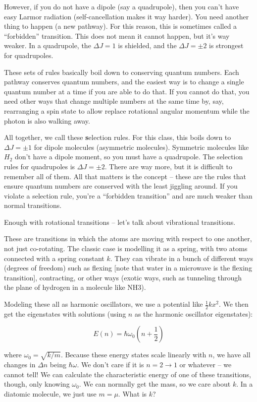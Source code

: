 \documentclass{article}
\newcommand{\be}{\begin{equation}}
\newcommand{\ee}{\end{equation}}
\begin{document}
However, if you do not have a dipole (say a quadrupole), then you can't have easy Larmor radiation (self-cancellation makes it way harder). You need another thing to happen (a new pathway). For this reason, this is sometimes called a ``forbidden'' transition. This does not mean it cannot happen, but it's way weaker. In a quadrupole, the $\Delta J = 1$ is shielded, and the $\Delta J = \pm 2$ is strongest for quadrupoles.

These sets of rules basically boil down to conserving quantum numbers. Each pathway conserves quantum numbers, and the easiest way is to change a single quantum number at a time if you are able to do that. If you cannot do that, you need other ways that change multiple numbers at the same time by, say, rearranging a spin state to allow replace rotational angular momentum while the photon is also walking away. 

All together, we call these {\textbf selection rules}. For this class, this boils down to $\Delta J = \pm 1$ for dipole molecules (asymmetric molecules). Symmetric molecules like $H_2$ don't have a dipole moment, so you must have a quadrupole. The selection rules for quadrupoles is $\Delta J = \pm 2$. There are way more, but it is difficult to remember all of them. All that matters is the concept -- these are the rules that ensure quantum numbers are conserved with the least jiggling around. If you violate a selection rule, you're a ``forbidden transition'' and are much weaker than normal transitions. 


Enough with rotational transitions -- let's talk about vibrational transitions. 

These are transitions in which the atoms are moving with respect to one another, not just co-rotating. The classic case is modelling it as a spring, with two atoms connected with a spring constant $k$. They can vibrate in a bunch of different ways (degrees of freedom) such as flexing [note that water in a microwave is the flexing transition], contracting, or other ways (exotic ways, such as tunneling through the plane of hydrogen in a molecule like NH3). 

Modeling these all as harmonic oscillators, we use a potential like $\frac12 k x^2$. We then get the eigenstates with solutions (using $n$ as the harmonic oscillator eigenstates):

\be
E(n) = \hbar \omega_0 \left(n + \frac12\right)
\ee

where $\omega_0 = \sqrt{k/m}$. Because these energy states scale linearly with $n$, we have all changes in $\Delta n$ being $\hbar \omega$. We don't care if it is $n=2\rightarrow1$ or whatever -- we cannot tell! We can calculate the characteristic energy of one of these transitions, though, only knowing $\omega_0$. We can normally get the mass, so we care about $k$. In a diatomic molecule, we just use $m = \mu$. What is $k$? 
\end{document}
